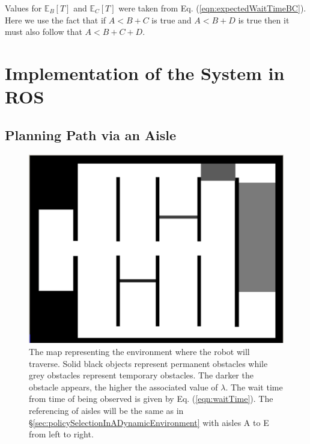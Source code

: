 \documentclass[a4paper,12pt]{article}
\begin{document}
			Values for $\mathbb{E}_{B}\left[T\right]$ and $\mathbb{E}_{C}\left[T\right]$ were taken from Eq. (\ref{eqn:expectedWaitTimeBC}). Here we use the fact that if $A<B+C$ is true and $A<B+D$ is true then it must also follow that $A<B+C+D$. 
	
	
	\section{Implementation of the System in ROS}
	\label{sec:implementationInROS}
	
		\subsection{Planning Path via an Aisle}
		\label{sec:planningPathViaAisleROS}
		
		\begin{figure}[H]
			\centering
			\includegraphics[width=.5\textwidth]{images/stdr_map.png}
			\caption{The map representing the environment where the robot will traverse. Solid black objects represent permanent obstacles while grey obstacles represent temporary obstacles. The darker the obstacle appears, the higher the associated value of $\lambda$. The wait time from time of being observed is given by Eq. (\ref{eqn:waitTime}). The referencing of aisles will be the same as in \S \ref{sec:policySelectionInADynamicEnvironment} with aisles A to E from left to right.}
			\label{fig:stdrMap}
		\end{figure}
		
\end{document}
